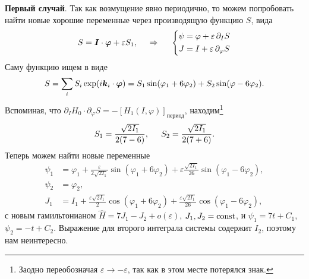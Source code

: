 \textbf{Первый случай}. Так как возмущение явно периодично, то можем попробовать найти новые хорошие переменные через производящую функцию $S$, вида
\begin{equation*}
    S = \mbox{\boldmath $I$} \cdot \mbox{\boldmath $\varphi$} + \varepsilon S_1,
    \hspace{0.5cm} \Rightarrow \hspace{0.5cm}
    \left\{\begin{aligned}
        \psi &= \varphi + \varepsilon\, \partial_I S \\
        J &= I + \varepsilon\, \partial_\varphi S
    \end{aligned}\right.
\end{equation*}
Саму функцию ищем в виде
\begin{equation*}
    S = \sum_i S_i \exp(i \mbox{\boldmath $k$}_i \cdot \mbox{\boldmath $\varphi$}) = S_1 \sin(\varphi_1 + 6 \varphi_2) + S_2 \sin (\varphi - 6 \varphi_2).
\end{equation*}
Вспоминая, что $\partial_I H_0 \cdot \partial_\varphi S = -\left[H_1(I, \varphi)\right]_{\text{период}}$, находим\footnote{
    Заодно переобозначая $\varepsilon \to - \varepsilon$, так как в этом месте потерялся знак.
} 
\begin{equation*}
    S_1 = \frac{\sqrt{2 I_1}}{2 (7-6)}, \hspace{5 mm} 
    S_2 = \frac{\sqrt{2 I_1}}{2 (7+6)}.
\end{equation*}
Теперь можем найти новые переменные
\begin{align*}
    \psi_1 &= \varphi_1 + \frac{\varepsilon}{2 \sqrt{2 I_1}} \sin(\varphi_1 + 6 \varphi_2) + \varepsilon \frac{\sqrt{2 I_1}}{26} \sin(\varphi_1 - 6 \varphi_2),\\
    \psi_2 &= \varphi_2, \\
    J_1 &= I_1 + \frac{\varepsilon \sqrt{2 I_1}}{2} \cos(\varphi_1 + 6 \varphi_2) + \frac{\varepsilon \sqrt{2 I_1}}{26} \cos(\varphi_1 - 6 \varphi_2), 
\end{align*}
с новым гамильтонианом $\hat{H} = 7 J_1 - J_2 + o(\varepsilon)$, $J_1, J_2 = \text{const}$, и $\psi_1 = 7 t + C_1$, $\psi_2 = - t + C_2$. Выражение для второго интеграла системы содержит $I_2$, поэтому нам неинтересно.

